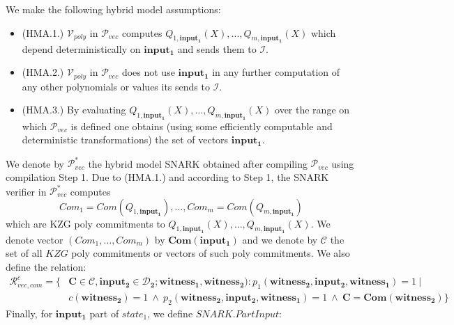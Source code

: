 \noindent We make the following hybrid model assumptions:
\begin{itemize}
\item (HMA.1.) $\mathcal{V}_{poly}$ in $\mathscr{P}_{\mathit{vec}}$ computes 
$\mathit{Q_{1,\mathbf{input_1}}}(X), \ldots, \mathit{Q_{m, \mathbf{input_1}}}(X)$ which depend deterministically on $\mathbf{input_1}$ and sends them to $\mathcal{I}$. 
\item (HMA.2.) $\mathcal{V}_{poly}$ in $\mathscr{P}_{\mathit{vec}}$ does not use $\mathbf{input_1}$ in any further computation of 
any other polynomials or values its sends to $\mathcal{I}$.
\item (HMA.3.) By evaluating $\mathit{Q_{1,\mathbf{input_1}}}(X), \ldots, \mathit{Q_{m, \mathbf{input_1}}}(X)$ over the range on which 
$\mathscr{P}_{\mathit{vec}}$ is defined one obtains (using some efficiently computable and deterministic transformations) the set of vectors $\mathbf{input_1}$. 
\end{itemize} 
We denote by $\mathscr{P}^*_{\mathit{vec}}$ the hybrid model SNARK obtained after compiling $\mathscr{P}_{\mathit{vec}}$ using compilation Step 1. 
Due to (HMA.1.) and according to Step 1, the SNARK verifier in 
$\mathscr{P}^*_{\mathit{vec}}$ computes $$\mathit{Com_1} = \mathit{Com}(\mathit{Q_{1,\mathbf{input_1}}}), \ldots, \mathit{Com_m} = \mathit{Com}(\mathit{Q_{m,\mathbf{input_1}}})$$ 
which are KZG poly commitments to $\mathit{Q_{1,\mathbf{input_1}}}(X), \ldots, \mathit{Q_{m, \mathbf{input_1}}}(X)$. We denote vector
$(\mathit{Com_1}, \ldots, \mathit{Com_m})$ by $\mathbf{Com}(\mathbf{input_1})$ and we denote 
by $\mathcal{C}$ the set of all $\mathit{KZG}$ poly commitments or vectors of such poly commitments. We also define the relation: 
\begin{align*}
\mathcal{R}_{\mathit{vec}, \mathit{com}}^c = \{& \mathbf{C} \in \mathcal{C}, \mathbf{input_2} \in \mathbf{\mathcal{D}_2}; \mathbf{witness_1}, \mathbf{witness_2}): p_1(\mathbf{witness_2}, \mathbf{input_2}, \mathbf{witness_1}) =1  \ | \\
& c(\mathbf{witness_2}) = 1  \ \wedge \ p_2(\mathbf{witness_2}, \mathbf{input_2}, \mathbf{witness_1}) = 1\ \wedge \ \mathbf{C} = \mathbf{Com}(\mathbf{witness_2})\}
\end{align*}
\noindent Finally, for $\mathbf{input_1}$ part of $\mathit{state_1}$, we define $\mathit{SNARK.PartInput}$:
